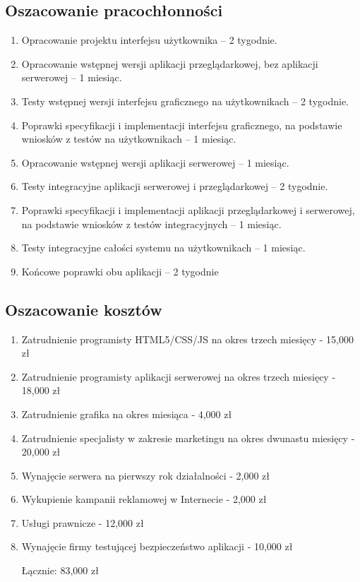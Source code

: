 \documentclass[12pt,a4paper]{report}
\newcommand{\blankpage}{
\newpage
\thispagestyle{empty}
\mbox{}
\newpage
}
\begin{document}
\subsection{Oszacowanie pracochłonności}
\begin{enumerate}
	\item Opracowanie projektu interfejsu użytkownika -- 2 tygodnie.
	\item Opracowanie wstępnej wersji aplikacji przeglądarkowej, bez aplikacji serwerowej -- 1 miesiąc.
	\item Testy wstępnej wersji interfejsu graficznego na użytkownikach -- 2 tygodnie.
	\item Poprawki specyfikacji i implementacji interfejsu graficznego, na podstawie wniosków z testów na użytkownikach -- 1 miesiąc.
	\item Opracowanie wstępnej wersji aplikacji serwerowej -- 1 miesiąc.
	\item Testy integracyjne aplikacji serwerowej i przeglądarkowej -- 2 tygodnie.
	\item Poprawki specyfikacji i implementacji aplikacji przeglądarkowej i serwerowej, na podstawie wniosków z testów integracyjnych -- 1 miesiąc.
	\item Testy integracyjne całości systemu na użytkownikach -- 1 miesiąc.
	\item Końcowe poprawki obu aplikacji -- 2 tygodnie 
\end{enumerate}
\subsection{Oszacowanie kosztów}
\begin{enumerate}
	\item Zatrudnienie programisty HTML5/CSS/JS na okres trzech miesięcy - 15,000 zł
	\item Zatrudnienie programisty aplikacji serwerowej na okres trzech miesięcy - 18,000 zł
	\item Zatrudnienie grafika na okres miesiąca - 4,000 zł
	\item Zatrudnienie specjalisty w zakresie marketingu na okres dwunastu miesięcy - 20,000 zł
	\item Wynajęcie serwera na pierwszy rok działalności - 2,000 zł
	\item Wykupienie kampanii reklamowej w Internecie - 2,000 zł
	\item Usługi prawnicze - 12,000 zł
	\item Wynajęcie firmy testującej bezpieczeństwo aplikacji - 10,000 zł

Łącznie: 83,000 zł
\end{enumerate}
\newpage
\blankpage
\end{document}
